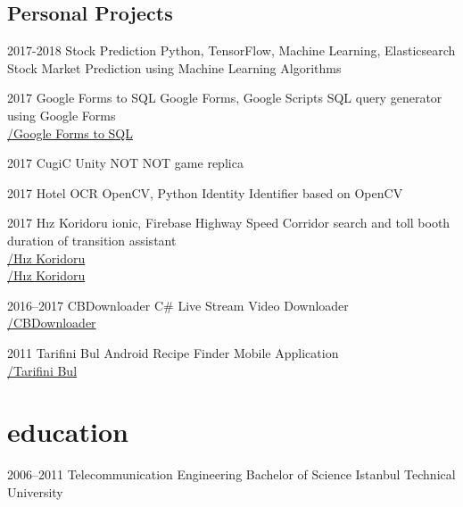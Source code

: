 \documentclass[]{../friggeri-cv} %
\begin{document}
\subsection{Personal Projects}

\begin{entrylist}

\entry
{2017-2018}
{Stock Prediction}
{Python, TensorFlow, Machine Learning, Elasticsearch}
{Stock Market Prediction using Machine Learning Algorithms}

\entry
{2017}
{Google Forms to SQL}
{Google Forms, Google Scripts}
{SQL query generator using Google Forms
\\\href{https://github.com/suphero/Google-Forms-to-SQL}{\faGithub/Google Forms to SQL}}

\entry
{2017}
{CugiC}
{Unity}
{NOT NOT game replica}

\entry
{2017}
{Hotel OCR}
{OpenCV, Python}
{Identity Identifier based on OpenCV}

\entry
{2017}
{Hız Koridoru}
{ionic, Firebase}
{Highway Speed Corridor search and toll booth duration of transition assistant
\\\href{https://play.google.com/store/apps/details?id=com.harunsokullu.speedcorridor}{\faAndroid/Hız Koridoru}
\\\href{https://itunes.apple.com/tr/app/h\%C4\%B1z-koridoru/id1265151812}{\faApple/Hız Koridoru}}

\entry
{2016--2017}
{CBDownloader}
{C\#}
{Live Stream Video Downloader
\\\href{https://github.com/suphero/CBDownloader}{\faGithub/CBDownloader}}

\entry
{2011}
{Tarifini Bul}
{Android}
{Recipe Finder Mobile Application
\\\href{https://play.google.com/store/apps/details?id=com.tarifinibul}{\faAndroid/Tarifini Bul}}

\end{entrylist}

\section{education}

\begin{entrylist}
	
\entry
{2006--2011}
{Telecommunication Engineering}
{Bachelor of Science}
{Istanbul Technical University}
	
\end{entrylist}
\end{document}
